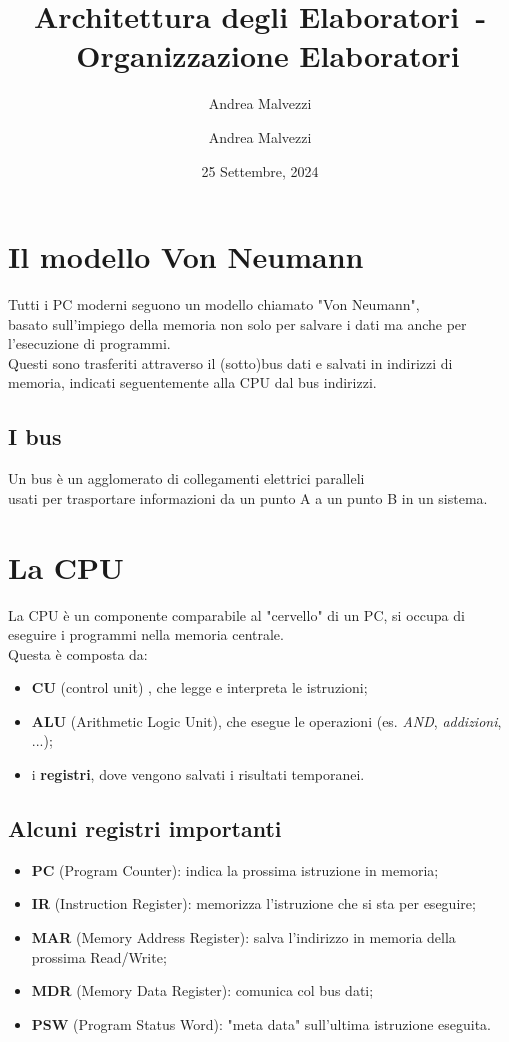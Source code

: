 \documentclass[12pt]{article}
\author{Andrea Malvezzi}
\title{\textbf{Architettura degli Elaboratori~-~Organizzazione Elaboratori}}  %
\date{25 Settembre, 2024}
\author{Andrea Malvezzi}
\begin{document}
\maketitle
\pagebreak
\tableofcontents
\pagebreak
\section{Il modello Von Neumann}
Tutti i PC moderni seguono un modello chiamato "Von Neumann",\\
basato sull'impiego della memoria non solo per salvare i dati ma anche per l'esecuzione di programmi.\\
Questi sono trasferiti attraverso il (sotto)bus dati e salvati in indirizzi di memoria, indicati seguentemente alla CPU dal bus indirizzi.
\subsection{I bus}
Un bus è un agglomerato di collegamenti elettrici paralleli\\
usati per trasportare informazioni da un punto A a un punto B in un sistema.
\section{La CPU}
La CPU è un componente comparabile al "cervello" di un PC, si occupa di eseguire i programmi nella memoria centrale.\\
Questa è composta da:
\begin{itemize}
    \item \textbf{CU} (control unit) , che legge e interpreta le istruzioni;
    \item \textbf{ALU} (Arithmetic Logic Unit), che esegue le operazioni (es. \textit{AND}, \textit{addizioni}, ...);
    \item i \textbf{registri}, dove vengono salvati i risultati temporanei.
\end{itemize}
\subsection{Alcuni registri importanti}
\begin{itemize}
    \item \textbf{PC} (Program Counter): indica la prossima istruzione in memoria;
    \item \textbf{IR} (Instruction Register): memorizza l'istruzione che si sta per eseguire;
    \item \textbf{MAR} (Memory Address Register): salva l'indirizzo in memoria della prossima Read/Write;
    \item \textbf{MDR} (Memory Data Register): comunica col bus dati;
    \item \textbf{PSW} (Program Status Word): "meta data" sull'ultima istruzione eseguita.
\end{itemize}
\end{document}
